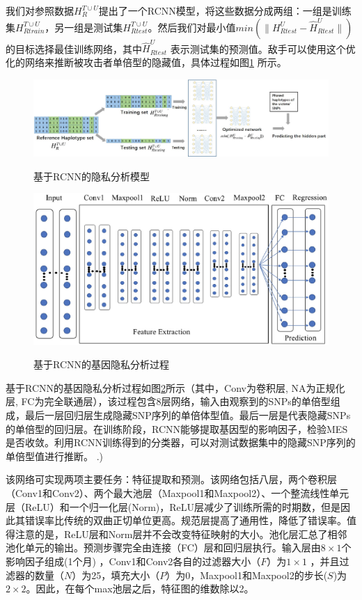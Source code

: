 我们对参照数据$H_R^{T \cup U}$提出了一个RCNN模型，将这些数据分成两组：一组是训练集$H_{Rtrain}^{T \cup U}$，另一组是测试集$H_{Rtest}^{T \cup U}$。然后我们对最小值$min(\|H_{Rtest}^{ U} - \hat{H}_{Rtest}^{U}\|)$的目标选择最佳训练网络，其中$\hat{H}_{Rtest}^{U}$ 表示测试集的预测值。敌手可以使用这个优化的网络来推断被攻击者单倍型的隐藏值，具体过程如图\ref{fig:rcnn_infer} 所示。

\begin{figure}[htbp]
	\centering
	\includegraphics[width=0.95\linewidth]{./figures/Fig3-RCNN-inference-attack.eps}\\
	\caption{基于RCNN的隐私分析模型}
	\label{fig:rcnn_infer}
\end{figure}


\begin{figure}[htbp]
	\centering
	\includegraphics[width=0.7\linewidth]{./figures/Fig4-RCNN-structure.eps}\\
	\caption{基于RCNN的基因隐私分析过程}
	\label{fig:RCNN}
\end{figure}
基于RCNN的基因隐私分析过程如图\ref{fig:RCNN}所示（其中，Conv为卷积层, NA为正规化层, FC为完全联通层），该过程包含8层网络，输入由观察到的SNPs的单倍型组成，最后一层回归层生成隐藏SNP序列的单倍体型值。最后一层是代表隐藏SNPs的单倍型的回归层。在训练阶段，RCNN能够提取基因型的影响因子，检验MES是否收敛。利用RCNN训练得到的分类器，可以对测试数据集中的隐藏SNP序列的单倍型值进行推断。
.) 

该网络可实现两项主要任务：特征提取和预测。该网络包括八层，两个卷积层（Conv1和Conv2）、两个最大池层（Maxpool1和Maxpool2）、一个整流线性单元层（ReLU）和一个归一化层(Norm)，ReLU层减少了训练所需的时期数，但是因此其错误率比传统的双曲正切单位更高。规范层提高了通用性，降低了错误率。值得注意的是，ReLU层和Norm层并不会改变特征映射的大小。池化层汇总了相邻池化单元的输出。预测步骤完全由连接（FC）层和回归层执行。输入层由$8\times 1$个影响因子组成(1个月) ，Conv1和Conv2各自的过滤器大小（$F$）为$1\times 1$ ，并且过滤器的数量（$N$）为25，填充大小（$P$）为0，Maxpool1和Maxpool2的步长($S$)为$2\times 2$。因此，在每个max池层之后，特征图的维数除以2。


